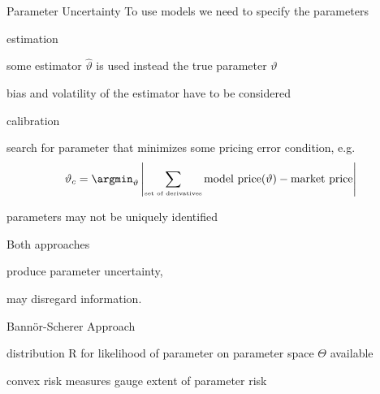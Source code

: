 


{Parameter Uncertainty}
To use models we need to specify the parameters






	estimation






	some estimator $\hat{\vartheta}$ is used instead the true parameter $\vartheta$

	bias and volatility of the estimator have to be considered






	calibration






	search for parameter that minimizes some pricing error condition, e.g.
$$
\vartheta_c = \argmin_{\vartheta} \left| \sum_{\mbox{\tiny set of derivatives}} \mbox{model price} (\vartheta) - \mbox{market price} \right|
$$

	parameters may not be uniquely identified






	Both approaches






	produce parameter uncertainty,

	may disregard information.











{Bann{\"o}r-Scherer Approach}






	distribution R for likelihood of parameter on parameter space $\Theta$  available

	convex risk measures gauge extent of parameter risk

